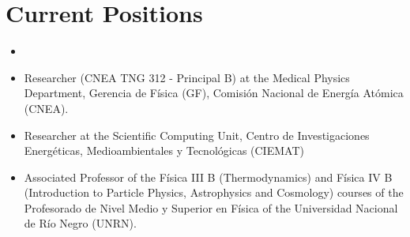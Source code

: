 \ifeng
\section*{Current Positions}
\begin{itemize}
    \item \item {} Researcher (CNEA TNG 312 - Principal B) at the Medical Physics Department, Gerencia de Física (GF), Comisión Nacional de Energía Atómica (CNEA).
    \item {} Researcher at the Scientific Computing Unit, Centro de Investigaciones Energéticas, Medioambientales y Tecnológicas (CIEMAT)
    \item {} Associated Professor of the Física III B (Thermodynamics) and Física IV B (Introduction to Particle Physics, Astrophysics and Cosmology) courses of the Profesorado de Nivel Medio y Superior en Física of the Universidad Nacional de Río Negro (UNRN).
\end{itemize}
\else
